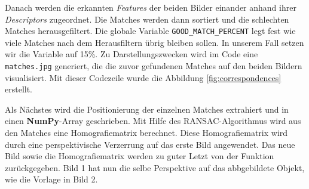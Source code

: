 Danach werden die erkannten \textit{Features} der beiden Bilder einander anhand ihrer \textit{Descriptors} zugeordnet. 
Die Matches werden dann sortiert und die schlechten Matches herausgefiltert. Die globale Variable \texttt{GOOD\_MATCH\_PERCENT} legt fest wie viele
Matches nach dem Herausfiltern übrig bleiben sollen. In unserem Fall setzen wir die Variable auf 15\%. Zu Darstellungszwecken wird im Code eine
\texttt{matches.jpg} generiert, die die zuvor gefundenen Matches auf den beiden Bildern visualisiert. Mit dieser Codezeile wurde die Abbildung 
\ref{fig:correspondences} erstellt.

Als Nächstes wird die Positionierung der einzelnen Matches extrahiert und in einen \textbf{NumPy}-Array geschrieben. Mit Hilfe des RANSAC-Algorithmus wird
aus den Matches eine Homografiematrix berechnet. Diese Homografiematrix wird durch eine perspektivische Verzerrung auf das erste Bild angewendet.
Das neue Bild sowie die Homografiematrix werden zu guter Letzt von der Funktion zurückgegeben. Bild 1 hat nun die selbe Perspektive auf das abbgebildete Objekt,
wie die Vorlage in Bild 2.

